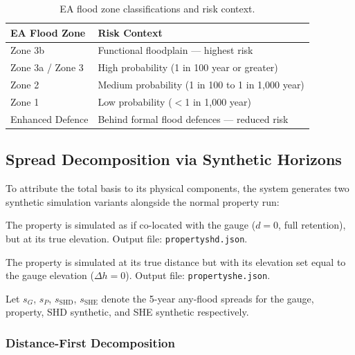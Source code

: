 \documentclass[11pt,a4paper]{article}
\begin{document}
\begin{table}[H]
    \centering
    \begin{tabular}{lp{9cm}}
        \toprule
        \textbf{EA Flood Zone} & \textbf{Risk Context} \\
        \midrule
        Zone 3b            & Functional floodplain --- highest risk \\
        Zone 3a / Zone 3   & High probability (1 in 100 year or greater) \\
        Zone 2             & Medium probability (1 in 100 to 1 in 1{,}000 year) \\
        Zone 1             & Low probability ($<$1 in 1{,}000 year) \\
        Enhanced Defence   & Behind formal flood defences --- reduced risk \\
        \bottomrule
    \end{tabular}
    \caption{EA flood zone classifications and risk context.}
    \label{tab:terrain_context}
\end{table}

\subsection{Spread Decomposition via Synthetic Horizons}
\label{sec:decomposition}

To attribute the total basis to its physical components, the system generates two
synthetic simulation variants alongside the normal property run:

\begin{description}[nosep]
    \item[SHD (Synthetic Horizon --- Distance zero):] The property is simulated as if
        co-located with the gauge ($d = 0$, full retention), but at its true elevation.
        Output file: \texttt{propertyshd.json}.
    \item[SHE (Synthetic Horizon --- Elevation zero):] The property is simulated at its
        true distance but with its elevation set equal to the gauge elevation
        ($\Delta h = 0$). Output file: \texttt{propertyshe.json}.
\end{description}

Let $s_G$, $s_P$, $s_{\text{SHD}}$, $s_{\text{SHE}}$ denote the 5-year any-flood
spreads for the gauge, property, SHD synthetic, and SHE synthetic respectively.

\subsubsection{Distance-First Decomposition}
\end{document}
